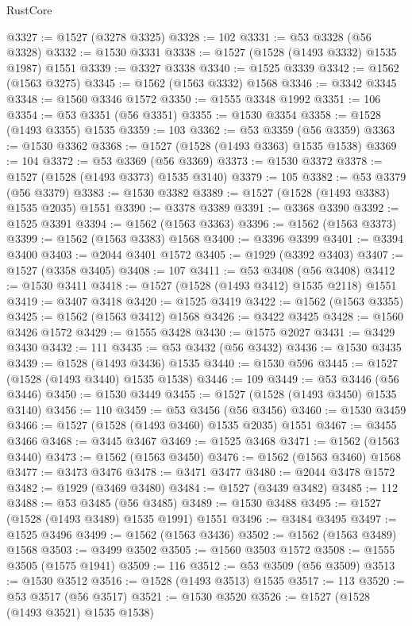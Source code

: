 \begin{lexlean}{RustCore}
\begin{coremodule}
@3327 := @1527 (@3278 @3325)
@3328 := 102
@3331 := @53 @3328 (@56 @3328)
@3332 := @1530 @3331
@3338 := @1527 (@1528 (@1493 @3332) @1535 @1987) @1551
@3339 := @3327 @3338
@3340 := @1525 @3339
@3342 := @1562 (@1563 @3275)
@3345 := @1562 (@1563 @3332) @1568
@3346 := @3342 @3345
@3348 := @1560 @3346 @1572
@3350 := @1555 @3348 @1992
@3351 := 106
@3354 := @53 @3351 (@56 @3351)
@3355 := @1530 @3354
@3358 := @1528 (@1493 @3355) @1535
@3359 := 103
@3362 := @53 @3359 (@56 @3359)
@3363 := @1530 @3362
@3368 := @1527 (@1528 (@1493 @3363) @1535 @1538)
@3369 := 104
@3372 := @53 @3369 (@56 @3369)
@3373 := @1530 @3372
@3378 := @1527 (@1528 (@1493 @3373) @1535 @3140)
@3379 := 105
@3382 := @53 @3379 (@56 @3379)
@3383 := @1530 @3382
@3389 := @1527 (@1528 (@1493 @3383) @1535 @2035) @1551
@3390 := @3378 @3389
@3391 := @3368 @3390
@3392 := @1525 @3391
@3394 := @1562 (@1563 @3363)
@3396 := @1562 (@1563 @3373)
@3399 := @1562 (@1563 @3383) @1568
@3400 := @3396 @3399
@3401 := @3394 @3400
@3403 := @2044 @3401 @1572
@3405 := @1929 (@3392 @3403)
@3407 := @1527 (@3358 @3405)
@3408 := 107
@3411 := @53 @3408 (@56 @3408)
@3412 := @1530 @3411
@3418 := @1527 (@1528 (@1493 @3412) @1535 @2118) @1551
@3419 := @3407 @3418
@3420 := @1525 @3419
@3422 := @1562 (@1563 @3355)
@3425 := @1562 (@1563 @3412) @1568
@3426 := @3422 @3425
@3428 := @1560 @3426 @1572
@3429 := @1555 @3428
@3430 := @1575 @2027
@3431 := @3429 @3430
@3432 := 111
@3435 := @53 @3432 (@56 @3432)
@3436 := @1530 @3435
@3439 := @1528 (@1493 @3436) @1535
@3440 := @1530 @596
@3445 := @1527 (@1528 (@1493 @3440) @1535 @1538)
@3446 := 109
@3449 := @53 @3446 (@56 @3446)
@3450 := @1530 @3449
@3455 := @1527 (@1528 (@1493 @3450) @1535 @3140)
@3456 := 110
@3459 := @53 @3456 (@56 @3456)
@3460 := @1530 @3459
@3466 := @1527 (@1528 (@1493 @3460) @1535 @2035) @1551
@3467 := @3455 @3466
@3468 := @3445 @3467
@3469 := @1525 @3468
@3471 := @1562 (@1563 @3440)
@3473 := @1562 (@1563 @3450)
@3476 := @1562 (@1563 @3460) @1568
@3477 := @3473 @3476
@3478 := @3471 @3477
@3480 := @2044 @3478 @1572
@3482 := @1929 (@3469 @3480)
@3484 := @1527 (@3439 @3482)
@3485 := 112
@3488 := @53 @3485 (@56 @3485)
@3489 := @1530 @3488
@3495 := @1527 (@1528 (@1493 @3489) @1535 @1991) @1551
@3496 := @3484 @3495
@3497 := @1525 @3496
@3499 := @1562 (@1563 @3436)
@3502 := @1562 (@1563 @3489) @1568
@3503 := @3499 @3502
@3505 := @1560 @3503 @1572
@3508 := @1555 @3505 (@1575 @1941)
@3509 := 116
@3512 := @53 @3509 (@56 @3509)
@3513 := @1530 @3512
@3516 := @1528 (@1493 @3513) @1535
@3517 := 113
@3520 := @53 @3517 (@56 @3517)
@3521 := @1530 @3520
@3526 := @1527 (@1528 (@1493 @3521) @1535 @1538)

\end{coremodule}
\end{lexlean}
